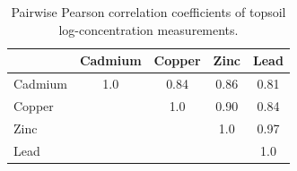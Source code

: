 \documentclass{article}
\begin{document}
\begin{table}[]
\centering
\begin{tabular}{|l|c|c|c|c|}
\hline
        & Cadmium & Copper & Zinc & Lead \\ \hline
Cadmium & 1.0     & 0.84   & 0.86 & 0.81 \\ \hline
Copper  &         & 1.0    & 0.90 & 0.84 \\ \hline
Zinc    &         &        & 1.0  & 0.97 \\ \hline
Lead    &         &        &      & 1.0  \\ \hline
\end{tabular}
\caption{Pairwise Pearson correlation coefficients of topsoil log-concentration measurements.}
\label{corr-table}
\end{table}

\newpage
\end{document}
